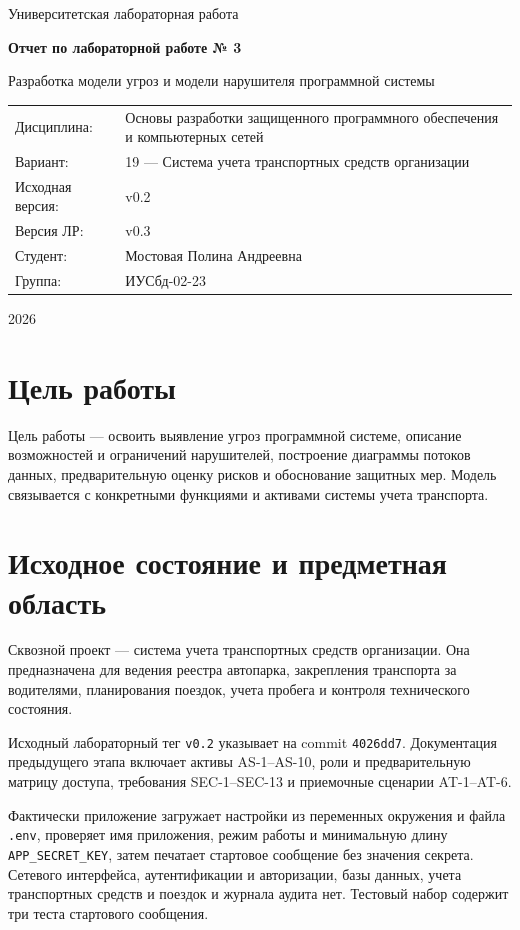 \documentclass[12pt,a4paper]{article}
\begin{document}
\begin{titlepage}
\centering
{\large Университетская лабораторная работа\par}
\vspace{2.5cm}
{\LARGE\bfseries Отчет по лабораторной работе № 3\par}
\vspace{0.6cm}
{\Large Разработка модели угроз и модели нарушителя программной системы\par}
\vspace{1.8cm}
\begin{tabular}{p{4cm}p{11cm}}
Дисциплина: & Основы разработки защищенного программного обеспечения и компьютерных сетей\\
Вариант: & 19 — Система учета транспортных средств организации\\
Исходная версия: & v0.2\\
Версия ЛР: & v0.3\\
Студент: & Мостовая Полина Андреевна\\
Группа: & ИУСбд-02-23
\end{tabular}
\vfill
{\large 2026\par}
\end{titlepage}
\tableofcontents
\clearpage

\section{Цель работы}
Цель работы — освоить выявление угроз программной системе, описание возможностей и ограничений нарушителей, построение диаграммы потоков данных, предварительную оценку рисков и обоснование защитных мер. Модель связывается с конкретными функциями и активами системы учета транспорта.

\section{Исходное состояние и предметная область}
Сквозной проект — система учета транспортных средств организации. Она предназначена для ведения реестра автопарка, закрепления транспорта за водителями, планирования поездок, учета пробега и контроля технического состояния.

Исходный лабораторный тег \texttt{v0.2} указывает на commit \texttt{4026dd7}. Документация предыдущего этапа включает активы AS-1–AS-10, роли и предварительную матрицу доступа, требования SEC-1–SEC-13 и приемочные сценарии AT-1–AT-6.

Фактически приложение загружает настройки из переменных окружения и файла \texttt{.env}, проверяет имя приложения, режим работы и минимальную длину \texttt{APP\_SECRET\_KEY}, затем печатает стартовое сообщение без значения секрета. Сетевого интерфейса, аутентификации и авторизации, базы данных, учета транспортных средств и поездок и журнала аудита нет. Тестовый набор содержит три теста стартового сообщения.
\end{document}
